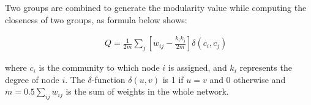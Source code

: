 Two groups are combined to generate the modularity value while computing the closeness of two groups, as formula below shows:

\begin{eqnarray}
&&Q=\frac{1}{2m}\sum_{j}\left[w_{ij}-\frac{k_ik_j}{2m}\right]\delta\left(c_i,c_j\right)
\end{eqnarray}

where $c_i$ is the community to which node $i$ is assigned, and $k_i$ represents the degree of node $i$. The $\delta$-function $\delta(u,v)$ is 1 if $u=v$ and 0 otherwise and $m=0.5\sum_{ij}w_{ij}$ is the sum of weights in the whole network.